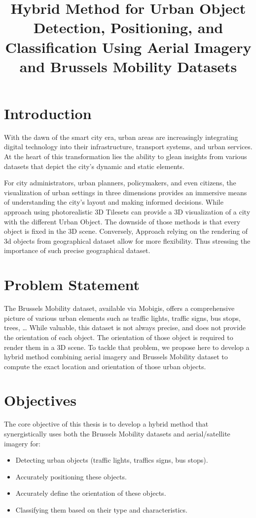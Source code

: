 \documentclass{article}
\title{Hybrid Method for Urban Object Detection, Positioning, and Classification Using Aerial Imagery and Brussels Mobility Datasets}
\author{} %
\date{} %
\begin{document}
\maketitle

\section{Introduction}

With the dawn of the smart city era, urban areas are increasingly integrating digital technology into their infrastructure, transport systems, and urban services. At the heart of this transformation lies the ability to glean insights from various datasets that depict the city's dynamic and static elements.

For city administrators, urban planners, policymakers, and even citizens, the visualization of urban settings in three dimensions provides an immersive means of understanding the city's layout and making informed decisions. While approach using photorealistic 3D Tilesets can provide a 3D visualization of a city with the different Urban Object. The downside of those methods is that every object is fixed in the 3D scene. Conversely, Approach relying on the rendering of 3d objects from geographical dataset allow for more flexibility. Thus stressing the importance of such precise geographical dataset.

\section{Problem Statement}

The Brussels Mobility dataset, available via Mobigis, offers a comprehensive picture of various urban elements such as traffic lights, traffic signs, bus stops, trees, … While valuable, this dataset is not always precise, and does not provide the orientation of each object. The orientation of those object is required to render them in a 3D scene. To tackle that problem, we propose here to develop a hybrid method combining aerial imagery and Brussels Mobility dataset to compute the exact location and orientation of those urban objects.

\section{Objectives}

The core objective of this thesis is to develop a hybrid method that synergistically uses both the Brussels Mobility datasets and aerial/satellite imagery for:
\begin{itemize}
    \item Detecting urban objects (traffic lights, traffics signs, bus stops).
    \item Accurately positioning these objects.
    \item Accurately define the orientation of these objects.
    \item Classifying them based on their type and characteristics.
\end{itemize}
\end{document}

